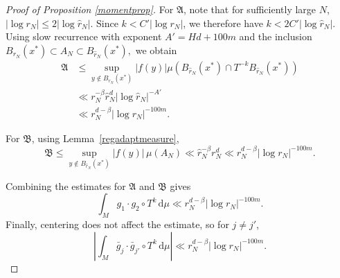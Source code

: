 \documentclass[11pt,twoside,a4paper,reqno]{amsart}
\renewcommand{\d}{\, \text{d}}
\begin{document}
\begin{proof}[Proof of Proposition \ref{momentprop}]
For $\mathfrak A$, note that for sufficiently large $N$, $|\log r_N|\leq 2|\log\hat{r}_N|$. Since $k<C'|\log r_N|$, we therefore have $k<2C'|\log\hat r_N|.$
Using slow recurrence with exponent $A'=Hd+100m$ and the inclusion $B_{r_N}(x^*)\subset A_N\subset B_{\hat r_N}(x^*),$
we obtain
\begin{align*}
\mathfrak A
&\leq
\sup_{y\notin B_{r_N}(x^*)}|f(y)|
\mu(B_{\hat{r}_N}(x^*)\cap T^{-k}B_{\hat{r}_N}(x^*))\\
&\ll
r_N^{-\beta}\hat{r}_N^d|\log\hat{r}_N|^{-A'}\\
&\ll
r_N^{d-\beta}|\log r_N|^{-100m}.
\end{align*}

For $\mathfrak B$, using Lemma~\ref{regadaptmeasure},
$$\mathfrak B\leq\sup_{y\notin B_{\hat{r}_N}(x^*)}|f(y)|\,\mu(A_N)\ll
\hat{r}_N^{-\beta}r_N^d\ll r_N^{d-\beta}|\log r_N|^{-100m}.
$$

Combining the estimates for $\mathfrak A$ and $\mathfrak B$ gives
\begin{equation*}
\int_M g_1\cdot g_2\circ T^k\d\mu
\ll
r_N^{d-\beta}|\log r_N|^{-100m}.
\end{equation*}
Finally, centering does not affect the estimate, so for $j\neq j'$,
\begin{equation*}
\left|\int_M\bar g_j\cdot\bar g_{j'}\circ T^k\d\mu\right|
\ll
r_N^{d-\beta}|\log r_N|^{-100m}.
\end{equation*}



\end{proof}
\end{document}
